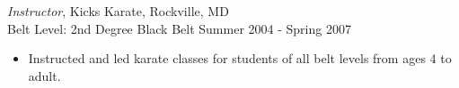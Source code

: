 \documentclass[10pt]{res} %
\begin{document}
\begin{resume}
{\sl Instructor}, Kicks Karate, Rockville, MD \\[2pt]
Belt Level: 2nd Degree Black Belt \hfill Summer 2004 - Spring 2007 
\begin{itemize} \itemsep 2pt %
\item Instructed and led karate classes for students of all belt levels from ages 4 to adult.
\end{itemize} 


 



\vspace{0.2in} %


\end{resume}
\end{document}
